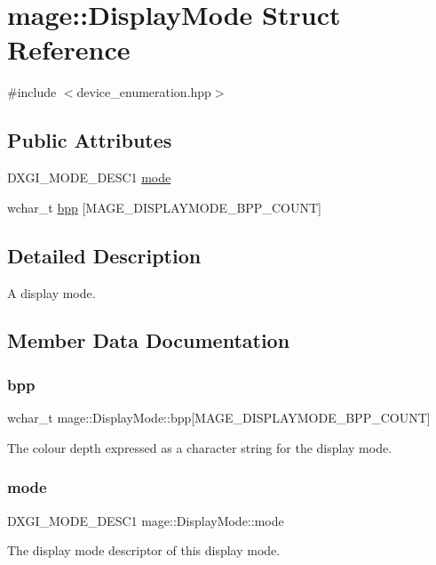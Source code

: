 \hypertarget{structmage_1_1_display_mode}{}\section{mage\+:\+:Display\+Mode Struct Reference}
\label{structmage_1_1_display_mode}


{\ttfamily \#include $<$device\+\_\+enumeration.\+hpp$>$}

\subsection*{Public Attributes}
\begin{DoxyCompactItemize}
\item 
D\+X\+G\+I\+\_\+\+M\+O\+D\+E\+\_\+\+D\+E\+S\+C1 \hyperlink{structmage_1_1_display_mode_a3e077be11308ea3f49bdb10940a9912f}{mode}
\item 
wchar\+\_\+t \hyperlink{structmage_1_1_display_mode_a2a834c7b0ff872557c8be1a8f363593a}{bpp} \mbox{[}M\+A\+G\+E\+\_\+\+D\+I\+S\+P\+L\+A\+Y\+M\+O\+D\+E\+\_\+\+B\+P\+P\+\_\+\+C\+O\+U\+NT\mbox{]}
\end{DoxyCompactItemize}


\subsection{Detailed Description}
A display mode. 

\subsection{Member Data Documentation}
\hypertarget{structmage_1_1_display_mode_a2a834c7b0ff872557c8be1a8f363593a}{}\label{structmage_1_1_display_mode_a2a834c7b0ff872557c8be1a8f363593a} 
\subsubsection{\texorpdfstring{bpp}{bpp}}
{\footnotesize\ttfamily wchar\+\_\+t mage\+::\+Display\+Mode\+::bpp\mbox{[}M\+A\+G\+E\+\_\+\+D\+I\+S\+P\+L\+A\+Y\+M\+O\+D\+E\+\_\+\+B\+P\+P\+\_\+\+C\+O\+U\+NT\mbox{]}}

The colour depth expressed as a character string for the display mode. \hypertarget{structmage_1_1_display_mode_a3e077be11308ea3f49bdb10940a9912f}{}\label{structmage_1_1_display_mode_a3e077be11308ea3f49bdb10940a9912f} 
\subsubsection{\texorpdfstring{mode}{mode}}
{\footnotesize\ttfamily D\+X\+G\+I\+\_\+\+M\+O\+D\+E\+\_\+\+D\+E\+S\+C1 mage\+::\+Display\+Mode\+::mode}

The display mode descriptor of this display mode. 